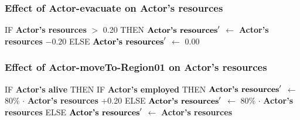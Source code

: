 \documentclass{article}%
\begin{document}
\subsubsection{Effect of Actor{-}evacuate on Actor's resources}%
\label{ssubsec:Effect of Actor{-}evacuate on Actor's resources}%
\begin{flushleft}%
IF %
\textbf{Actor's resources}%
$>$%
0.20%
\linebreak%
\hspace*{2em}%
THEN %
$\mbox{\textbf{Actor's resources}} '$%
$\leftarrow$%
\textbf{Actor's resources}%
${-}0.20$%
\linebreak%
\hspace*{2em}%
ELSE %
$\mbox{\textbf{Actor's resources}} '$%
$\leftarrow$%
0.00%
\end{flushleft}

%
\subsubsection{Effect of Actor{-}moveTo{-}Region01 on Actor's resources}%
\label{ssubsec:Effect of Actor{-}moveTo{-}Region01 on Actor's resources}%
\begin{flushleft}%
IF %
\textbf{Actor's alive}%
\linebreak%
\hspace*{2em}%
THEN %
IF %
\textbf{Actor's employed}%
\linebreak%
\hspace*{4em}%
THEN %
$\mbox{\textbf{Actor's resources}} '$%
$\leftarrow$%
80\%%
$\cdot$%
\textbf{Actor's resources}%
+0.20%
\linebreak%
\hspace*{4em}%
ELSE %
$\mbox{\textbf{Actor's resources}} '$%
$\leftarrow$%
80\%%
$\cdot$%
\textbf{Actor's resources}%
\linebreak%
\hspace*{2em}%
ELSE %
$\mbox{\textbf{Actor's resources}} '$%
$\leftarrow$%
\textbf{Actor's resources}%
\end{flushleft}

%
\end{document}
